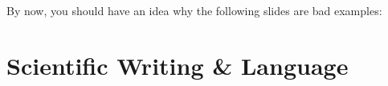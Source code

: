 \documentclass[11pt,a4paper]{article}
\begin{document}
\begin{badexample}
  By now, you should have an idea why the following slides are bad examples:
  \begin{figure}[H]
    \centering%
    {%
      \setlength{\fboxsep}{0pt}%
      \setlength{\fboxrule}{2pt}%
    }
  \end{figure}
  \begin{figure}[H]
    \centering%
    {%
      \setlength{\fboxsep}{0pt}%
      \setlength{\fboxrule}{2pt}%
    }
  \end{figure}
\end{badexample}



\newpage
\section{Scientific Writing \& Language}
\label{sec-writing}
\end{document}
